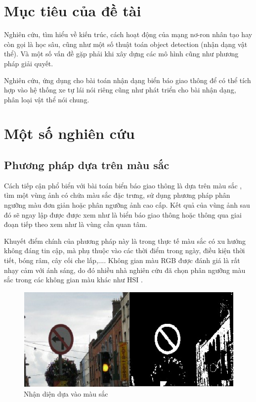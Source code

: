 \section{Mục tiêu của đề tài}
Nghiên cứu, tìm hiểu về kiến trúc, cách hoạt động của mạng nơ-ron nhân tạo hay còn gọi là học sâu, cũng như một số thuật toán object detection (nhận dạng vật thể). Và một số vấn đề gặp phải khi xây dựng các mô hình cũng như phương pháp giải quyết.\par
Nghiên cứu, ứng dụng cho bài toán nhận dạng biển báo giao thông để có thể tích hợp vào hệ thống xe tự lái nói riêng cũng như phát triển cho bài nhận dạng, phân loại vật thể nói chung. 
\section{Một số nghiên cứu}
\subsection{Phương pháp dựa trên màu sắc}
Cách tiếp cận phổ biển với bài toán biển báo giao thông là dựa trên màu sắc \cite{trafficcolor} \cite{trafficcolor1}, tìm một vùng ảnh có chứa màu sắc đặc trưng, sử dụng phương pháp phân ngưỡng màu đơn giản hoặc phân ngưỡng ảnh cao cấp. Kết quả của vùng ảnh sau đó sẽ ngay lập được được xem như là biển báo giao thông hoặc thông qua giai đoạn tiếp theo xem như là vùng cần quan tâm.\par
Khuyết điểm chính của phương pháp này là trong thực tế màu sắc có xu hướng không đáng tin cập, mà phụ thuộc vào các thời điểm trong ngày, điều kiện thời tiết, bóng râm, cây cối che lấp,.... Không gian màu RGB được đánh giá là rất nhạy cảm với ánh sáng, do đó nhiều nhà nghiên cứu đã chọn phân ngưỡng màu sắc trong các không gian màu khác như HSI \cite{trafficcolor3}.
\begin{figure}[H]
\begin{center}
\includegraphics[scale=0.8]{header/image/detectbycolor.jpg}
\end{center}
\caption{Nhận diện dựa vào màu sắc}
\end{figure}
